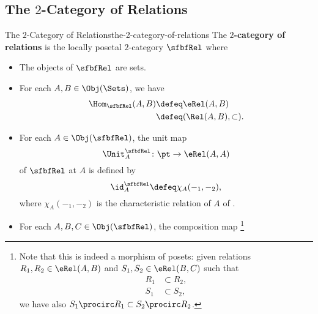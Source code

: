 \subsection{The $2$-Category of Relations}\label{subsection-the-2-category-of-relations}
\begin{definition}{The $2$-Category of Relations}{the-2-category-of-relations}%
    The \textbf{$2$-category of relations} is the locally posetal $2$-category $\sfbfRel$ where
    \begin{itemize}
        \item{}The objects of $\sfbfRel$ are sets.
        \item{}For each $A,B\in\Obj(\Sets)$, we have
            \begin{align*}
                \Hom_{\sfbfRel}(A,B) &\defeq \eRel(A,B)\\%
                                     &\defeq (\Rel(A,B),\subset).%
            \end{align*}
        \item{}For each $A\in\Obj(\sfbfRel)$, the unit map
            \[
                \Unit^{\sfbfRel}_{A}
                \colon
                \pt
                \to
                \eRel(A,A)
            \]%
            of $\sfbfRel$ at $A$ is defined by
            \[
                \id^{\sfbfRel}_{A}
                \defeq
                \chi_{A}(-_{1},-_{2}),
            \]%
            where $\chi_{A}(-_{1},-_{2})$ is the characteristic relation of $A$ of .
        \item{}For each $A,B,C\in\Obj(\sfbfRel)$, the composition map%
            \footnote{%
                Note that this is indeed a morphism of posets: given relations $R_{1},R_{2}\in\eRel(A,B)$ and $S_{1},S_{2}\in\eRel(B,C)$ such that
                \begin{align*}
                    R_{1} &\subset R_{2},\\
                    S_{1} &\subset S_{2},
                \end{align*}
                we have also $S_{1}\procirc R_{1}\subset S_{2}\procirc R_{2}$.
}
\end{itemize}
\end{definition}
